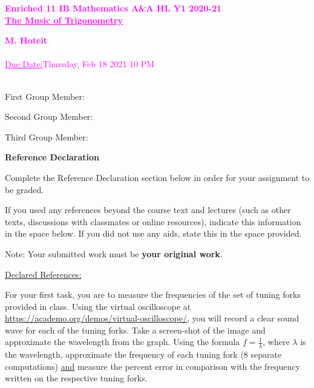 \documentclass[12pt,oneside]{article}
\newcommand{\magenta}{\textcolor{magenta}}
\begin{document}
\noindent
\magenta{\Large{\bf Enriched 11 IB Mathematics A\&A HL Y1 \hfill {2020-21}}\\
\underline{\Large{\bf The Music of Trigonometry}}\\}

\magenta{\large{\bf M. Hoteit}\\\\
\large{\underline{Due Date:}\quad  Thursday, Feb 18 2021 10 PM}\\}
\vspace{0.015in}\hrulefill\ 

\large{First Group Member:  %
}

\large{Second Group Member:  %
}

\large{Third Group Member:  %
}
\\

\normalsize


\textbf{Reference Declaration}

Complete the Reference Declaration section below in order for your assignment to be graded.

If you used any references beyond the course text and lectures (such as other texts, discussions with classmates or online resources), indicate this information in the space below.  If you did not use any aids, state this in the space provided. 

Note: Your submitted work must be \textbf{your original work}. 



\underline{Declared References:} \\




\newpage


\begin{tcolorbox}[breakable, enhanced, colframe=blue!25,
colback=white!10,
coltitle=blue!20!black,  
title= {\bf Task 1: Basic Tuning Fork Frequencies.}] 
For your first task, you are to measure the frequencies of the set of tuning forks provided in class. Using the virtual oscilloscope at \url{https://academo.org/demos/virtual-oscilloscope/}, you will record a clear sound wave for each of the tuning forks. Take a screen-shot of the image and approximate the wavelength from the graph. Using the formula $f=\tfrac{1}{\lambda}$, where $\lambda$ is the wavelength, approximate the frequency of each tuning fork (8 separate computations) \underline{and} measure the percent error in comparison with the frequency written on the respective tuning forks.
\end{tcolorbox}
\end{document}
